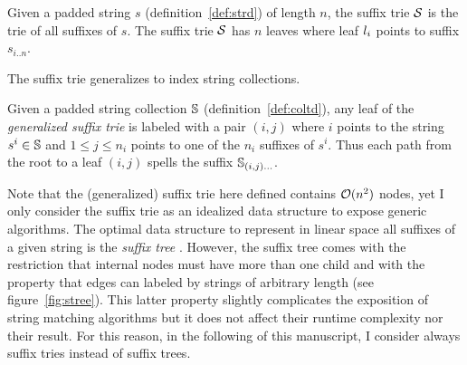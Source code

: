 \begin{definition}
Given a padded string $s$ (definition~\ref{def:strd}) of length $n$, the suffix trie $\mathcal {S}$ is the trie of all suffixes of $s$.
The suffix trie $\mathcal {S}$ has $n$ leaves where leaf $l_i$ points to suffix $s_{i..n}$.
\end{definition}
The suffix trie generalizes to index string collections.
\begin{definition}
Given a padded string collection $\mathbb {S}$ (definition~\ref{def:coltd}), any leaf of the \emph{generalized suffix trie} is labeled with a pair $(i,j)$ where $i$ points to the string $s^i \in \mathbb {S}$ and $1 \leq j \leq n_i$ points to one of the $n_i$ suffixes of $s^i$.
Thus each path from the root to a leaf $(i,j)$ spells the suffix $\mathbb {S}_{(i,j) \dots}$.
\end{definition}

Note that the (generalized) suffix trie here defined contains $\mathcal{O}(n^2)$ nodes, yet I only consider the suffix trie as an idealized data structure to expose generic algorithms.
The optimal data structure to represent in linear space all suffixes of a given string is the \emph{suffix tree} \citep{Morrison1968}.
However, the suffix tree comes with the restriction that internal nodes must have more than one child and with the property that edges can labeled by strings of arbitrary length (see figure~\ref{fig:stree}).
This latter property slightly complicates the exposition of string matching algorithms but it does not affect their runtime complexity nor their result.
For this reason, in the following of this manuscript, I consider \wlogs always suffix tries instead of suffix trees.

\begin{figure}[h]
\caption[Example of suffix trie and suffix tree]{Suffix trie and suffix tree of the string {\ttfamily ANANAS\$} .}
\label{fig:stree}
\begin{subfigure}{.5\textwidth}
\begin{center}

\end{center}
\end{subfigure}%
\begin{subfigure}{.5\textwidth}
\begin{center}

\end{center}
\end{subfigure}
\end{figure}

